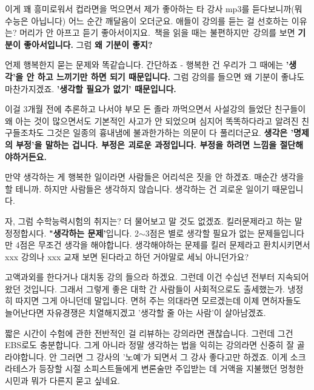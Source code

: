 이게 꽤 흥미로워서 컵라면을 먹으면서 제가 좋아하는 타 강사 mp3를 듣다보니까(뭐 수능은 아닙니다) 어느 순간 깨달음이 오더군요.
애들이 강의를 듣는 걸 선호하는 이유는?
머리가 안 아프고 듣기 좋아서이지요. 책을 읽을 때는 불편하지만 강의를 보면 \textbf{기분이 좋아서입니다.}
그럼 \textbf{왜 기분이 좋지?}
\vspace{5mm}

언제 행복한지 묻는 문제와 똑같습니다. 간단하죠 - 행복한 건 우리가 그 때에는 \textbf{'생각'을 안 하고 느끼기만 하면 되기 때문입니다.}
그럼 강의를 들으면 왜 기분이 좋냐도 마찬가지겠죠. \textbf{'생각할 필요가 없기' 때문입니다.}
\vspace{5mm}

이걸 3개월 전에 추론하고 나서야
부모 돈 졸라 까먹으면서 사설강의 들었단 친구들이 왜 아는 것이 많으면서도 기본적인 사고가 안 되었으며
심지어 똑똑하다라고 알려진 친구들조차도 그것은 일종의 흉내냄에 불과한가하는 의문이 다 풀리더군요.
\textbf{생각은 '명제의 부정'을 말하는 겁니다. 부정은 괴로운 과정입니다. 부정을 하려면 느낌을 절단해야하거든요.}
\vspace{5mm}

만약 생각하는 게 행복한 일이라면 사람들은 어리석은 짓을 안 하겠죠. 매순간 생각을 할 테니까.
하지만 사람들은 생각하지 않습니다. 생각하는 건 괴로운 일이기 때문입니다.
\vspace{5mm}

자, 그럼 수학능력시험의 취지는?
더 물어보고 말 것도 없겠죠. 킬러문제라고 하는 말 정정합시다. \textbf{"생각하는 문제'}입니다.
2$\sim$3점은 별로 생각할 필요가 없는 문제들입니다만 4점은 무조건 생각을 해야합니다.
생각해야하는 문제를 킬러 문제라고 환치시키면서 xxx 강의나 xxx 교재 보면 된다라고 하던 거야말로 세뇌 아니던가요?
\vspace{5mm}

고액과외를 한다거나 대치동 강의 들으라 하겠요. 그런데 이건 수십년 전부터 지속되어왔던 것입니다.
그래서 그렇게 좋은 대학 간 사람들이 사회적으로도 출세했는가. 냉정히 따지면 그게 아니던데 말입니다.
면허 주는 의대라면 모르겠는데 이제 면허자들도 늘어난다면 자유경쟁은 치열해지겠고 '생각할 줄 아는 사람'이 살아남겠죠.
\vspace{5mm}

짧은 시간이 수험에 관한 전반적인 걸 리뷰하는 강의라면 괜찮습니다. 그런데 그건 EBS로도 충분합니다.
그게 아니라 정말 생각하는 법을 익히는 강의라면 신중히 잘 골라야합니다. 안 그러면 그 강사의 '노예'가 되면서 그 강사 좋다고만 하겠죠.
이게 소크라테스가 등장할 시절 소피스트들에게 변론술만 주입받는 데 거액을 지불했던 멍청한 시민과 뭐가 다른지 묻고 싶네요.
\vspace{5mm}

